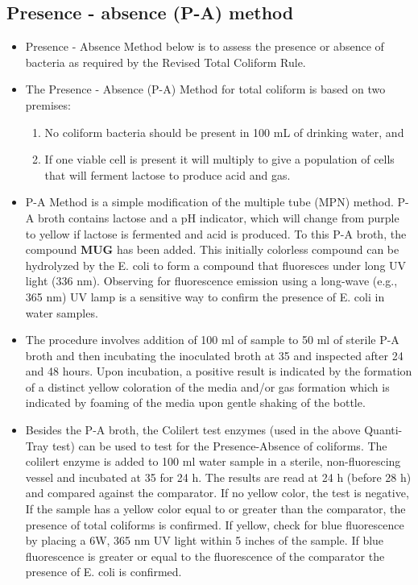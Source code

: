 \subsection{Presence - absence (P-A) method}
\begin{itemize}
\item Presence - Absence Method below is to assess the presence or absence of bacteria as required by the Revised Total Coliform Rule.
\item The Presence - Absence (P-A) Method for total coliform is based on two premises:
\begin{enumerate}
\item No coliform bacteria should be present in 100 mL of drinking water, and
\item If one viable cell is present it will multiply to give a population of cells that will ferment lactose to produce acid and gas.
\end{enumerate}

\item P-A Method is a simple modification of the multiple tube (MPN) method. P-A broth contains lactose and a pH indicator, which will change from purple to yellow if lactose is fermented and acid is produced. To this P-A broth, the compound \textbf{MUG} has been added. This initially colorless compound can be hydrolyzed by the E. coli to form a compound that fluoresces under long UV light (336 nm). Observing for fluorescence emission using a long-wave (e.g., 365 nm) UV lamp is a sensitive way to confirm the presence of E. coli in water samples.
 
\item The procedure involves addition of 100 ml of sample to 50 ml of sterile P-A broth and then incubating the inoculated broth at 35 and inspected after 24 and 48 hours. Upon incubation, a positive result is indicated by the formation of a distinct yellow coloration of the media and/or gas formation which is indicated by foaming of the media upon gentle shaking of the bottle. 

\item Besides the P-A broth, the Colilert test enzymes (used in the above Quanti-Tray test) can be used to test for the Presence-Absence of coliforms.  The colilert enzyme is added to 100 ml water sample in a sterile, non-fluorescing vessel and incubated at 35 for 24 h. The results are read at 24 h (before 28 h) and compared against the comparator. If no yellow color, the test is negative, If the sample has a yellow color equal to or greater than the comparator, the presence of total coliforms is confirmed. If yellow, check for blue fluorescence by placing a 6W, 365 nm UV light within 5 inches of the sample. If blue fluorescence is greater or equal to the fluorescence of the comparator the presence of E. coli is confirmed. 
\end{itemize}

